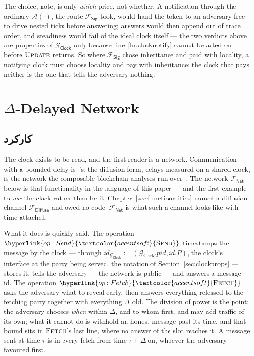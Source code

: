 \documentclass[10pt,oneside,openany]{book}
\makeatletter
\newcommand{\nav@headtext}{}
\newcommand{\nav@setheadtext}[1]{%
  \gdef\nav@headtext{%
    \ifnum\c@secnumdepth>\m@ne
      \if@mainmatter \@chapapp\ \lr{\thechapter.}\ \fi
    \fi #1}}
\newcommand{\chapterhead}[1]{\nav@setheadtext{#1}}
\newcommand{\PID}{\mathit{pid}}
\newcommand{\Adv}{\mathcal{A}}
\newcommand{\op}[1]{\textnormal{\textsc{#1}}}
\newcommand{\opl}[1]{\hyperlink{op:#1}{\textcolor{accentsoft}{\op{#1}}}}
\newcommand{\id}{id}
\newcommand{\Fdiffuse}{\mathcal{F}_{\mathsf{Diffuse}}}
\newcommand{\Fsig}{\mathcal{F}_{\mathsf{Sig}}}
\newcommand{\Gclock}{\mathcal{G}_{\mathsf{Clock}}}
\newcommand{\Fnet}{\mathcal{F}_{\mathsf{Net}}}
\theoremstyle{accentdef}
\theoremstyle{accentplain}
\makeatother
\begin{document}
The choice, note, is only \emph{which} price, not whether. A notification through the ordinary
$\Adv(\cdot)$, the route $\Fsig$ took, would hand the token to an adversary free to drive nested
ticks before answering; answers would then append out of trace order, and steadiness would fail
of the ideal clock itself --- the two verdicts above are properties of $\Gclock$ only because
line~\ref{ln:clocknotify} cannot be acted on before $\op{Update}$ returns. So where $\Fsig$ chose
inheritance and paid with locality, a notifying clock must choose locality and pay with
inheritance; the clock that pays neither is the one that tells the adversary nothing.

\chapter{\texorpdfstring{$\Delta$}{Δ}-Delayed Network}\label{sec:fnet}
\chapterhead{Delta-Delayed Network}

\section{کارکرد}\label{sec:fnetfunc}

The clock exists to be read, and the first reader is a network. Communication with a bounded
delay is~\cite{KMTZ13}'s; the diffusion form, delays measured on a shared clock, is the network
the composable blockchain analyses run over~\cite{BMTZ17}. The network $\Fnet$ below is that functionality
in the language of this paper --- and the first example to \emph{use} the clock rather than be
it. Chapter~\ref{sec:functionalities} named a diffusion channel $\Fdiffuse$ and owed no code;
$\Fnet$ is what such a channel looks like with time attached.

What it does is quickly said. The operation $\opl{Send}$ timestamps the message by the clock --- through
$\id_{\Gclock} := (\Gclock.\PID,\id.P)$, the clock's interface at the party being served, the
notation of Section~\ref{sec:clockprops} --- stores it, tells the adversary --- the network is
public --- and answers a message id. The operation $\opl{Fetch}$ asks the
adversary what to reveal early, then answers everything released to the fetching party together
with everything $\Delta$ old. The division of power is the point: the adversary chooses
\emph{when} within $\Delta$, and to whom first, and may add traffic of its own; what it cannot do
is withhold an honest message past its time, and that bound sits in $\op{Fetch}$'s last line,
where no answer of the slot reaches it. A message sent at time $\tau$ is in every fetch from
time $\tau + \Delta$ on, whoever the adversary favoured first.
\end{document}
